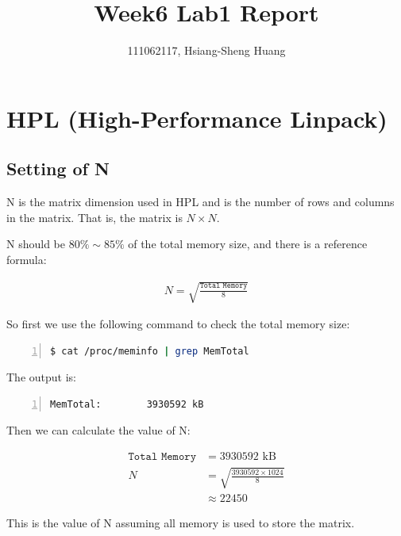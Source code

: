 \documentclass{article}
\title{Week6 Lab1 Report}
\author{111062117, Hsiang-Sheng Huang}
\begin{document}
\maketitle

\section*{HPL (High-Performance Linpack)}

\subsection*{Setting of N}

N is the matrix dimension used in HPL and is the number of rows and columns in the matrix. That is, the matrix is $N \times N$.

\vspace{1em}

N should be $80\% \sim 85\%$ of the total memory size, and there is a reference formula:

\begin{align*}
N = \sqrt{\frac{\texttt{Total\ Memory}}{8}}
\end{align*}

So first we use the following command to check the total memory size:

\begin{lstlisting}[language=bash, basicstyle=\ttfamily\small, numbers=left, numberstyle=\tiny\color{gray}, stepnumber=1, frame=single]
$ cat /proc/meminfo | grep MemTotal
\end{lstlisting}

The output is:

\begin{lstlisting}[language=bash, basicstyle=\ttfamily\small, numbers=left, numberstyle=\tiny\color{gray}, stepnumber=1, frame=single]
MemTotal:        3930592 kB
\end{lstlisting}

Then we can calculate the value of N:

\begin{align*}
\texttt{Total\ Memory} & = 3930592 \text{ kB} \\
N & = \sqrt{\frac{3930592 \times 1024}{8}} \\
    & \approx 22450
\end{align*}

This is the value of N assuming all memory is used to store the matrix.

\vspace{1em}
\end{document}
